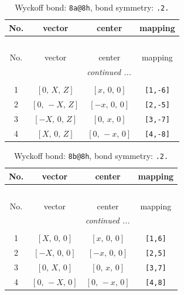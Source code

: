 \documentclass[fleqn,8pt]{jsarticle}
\begin{document}
\begin{longtable}{cccc}
\caption{Wyckoff bond: {\tt 8a@8h}, bond symmetry: {\tt .2.}}
 \\
 \hline \hline
No. & vector & center & mapping \\ \hline \endfirsthead

\multicolumn{3}{l}{\tablename\ \thetable{}} \\
 \hline \hline
No. & vector & center & mapping \\ \hline \endhead

 \hline \hline
\multicolumn{3}{r}{\footnotesize\it continued ...} \\ \endfoot

 \hline \hline
\multicolumn{3}{r}{} \\ \endlastfoot

1 & $\left[ 0,\, X,\, Z \right]$ & $\left[ x,\, 0,\, 0 \right]$ & {\tt [1,-6]} \\ \hline
2 & $\left[ 0,\, - X,\, Z \right]$ & $\left[ - x,\, 0,\, 0 \right]$ & {\tt [2,-5]} \\ \hline
3 & $\left[ - X,\, 0,\, Z \right]$ & $\left[ 0,\, x,\, 0 \right]$ & {\tt [3,-7]} \\ \hline
4 & $\left[ X,\, 0,\, Z \right]$ & $\left[ 0,\, - x,\, 0 \right]$ & {\tt [4,-8]} \\
\end{longtable}
\renewcommand{\arraystretch}{1.2}
\begin{longtable}{cccc}
\caption{Wyckoff bond: {\tt 8b@8h}, bond symmetry: {\tt .2.}}
 \\
 \hline \hline
No. & vector & center & mapping \\ \hline \endfirsthead

\multicolumn{3}{l}{\tablename\ \thetable{}} \\
 \hline \hline
No. & vector & center & mapping \\ \hline \endhead

 \hline \hline
\multicolumn{3}{r}{\footnotesize\it continued ...} \\ \endfoot

 \hline \hline
\multicolumn{3}{r}{} \\ \endlastfoot

1 & $\left[ X,\, 0,\, 0 \right]$ & $\left[ x,\, 0,\, 0 \right]$ & {\tt [1,6]} \\ \hline
2 & $\left[ - X,\, 0,\, 0 \right]$ & $\left[ - x,\, 0,\, 0 \right]$ & {\tt [2,5]} \\ \hline
3 & $\left[ 0,\, X,\, 0 \right]$ & $\left[ 0,\, x,\, 0 \right]$ & {\tt [3,7]} \\ \hline
4 & $\left[ 0,\, - X,\, 0 \right]$ & $\left[ 0,\, - x,\, 0 \right]$ & {\tt [4,8]} \\
\end{longtable}
\end{document}
